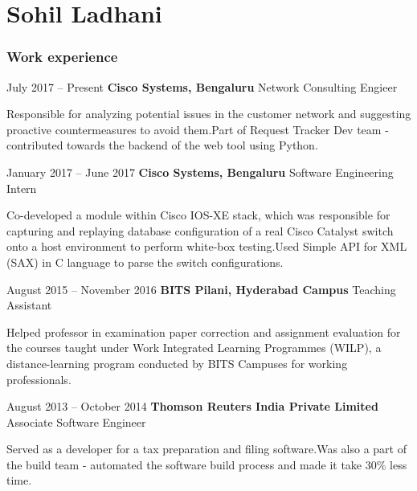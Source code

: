 \documentclass[fontsize=10pt]{tccv}
\begin{document}
\part{Sohil Ladhani}

\section{Work experience}

\begin{eventlist}

\item{July 2017 -- Present}
	{\textbf{Cisco Systems, Bengaluru}}
     {Network Consulting Engieer}

Responsible for analyzing potential issues in the customer network and suggesting
proactive countermeasures to avoid them.\newline Part of Request Tracker Dev team -
contributed towards the backend of the web tool using Python.

\item{January 2017 -- June 2017}
	{\textbf{Cisco Systems, Bengaluru}}
     {Software Engineering Intern}

Co-developed a module within Cisco IOS-XE stack, which was responsible for
capturing and replaying database configuration of a real Cisco Catalyst switch onto a
	host environment to perform white-box testing.\newline Used Simple API for XML (SAX)
	in C language to parse the switch configurations.

\item{August 2015 -- November 2016}
	{\textbf{BITS Pilani, Hyderabad Campus}}
     {Teaching Assistant}

Helped professor in examination paper correction and assignment evaluation for the courses
taught under Work Integrated Learning Programmes (WILP), a distance-learning program
conducted by BITS Campuses for working professionals.


\item{August 2013 -- October 2014}
	{\textbf{Thomson Reuters India Private Limited}}
     {Associate Software Engineer}

Served as a developer for a tax preparation and filing software.\newline Was also a part of the
build team - automated the software build process and made it take 30\% less time.

\end{eventlist}
\end{document}
